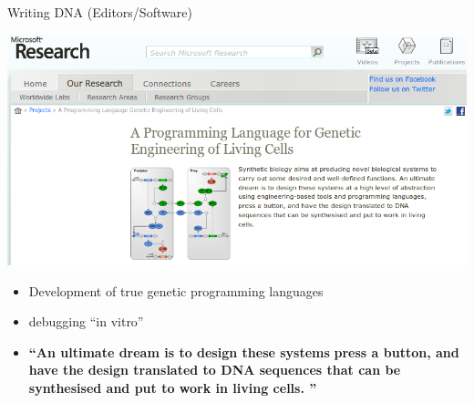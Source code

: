 \begin{frame}{Writing DNA (Editors/Software)}
\footnotesize
\begin{center}
\includegraphics[width=1.0\textwidth]{./images/trueGeneticProgrammingLanguages.png}
\end{center}

\begin{itemize}
\footnotesize
  \item Development of true genetic programming languages 	
  \item debugging “in vitro”
  \item \textbf{“An ultimate dream is to design these systems} %
	  \textbf{press a button, and have the design translated to DNA sequences that can be synthesised 
      and put to work in living cells. ”}
  \end{itemize}
\end{frame}

